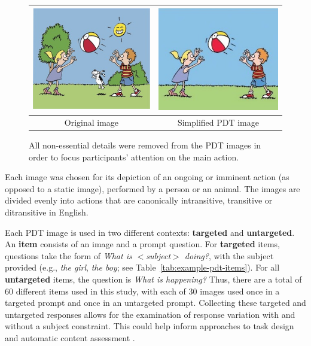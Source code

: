 \begin{figure}[htb!]
\begin{center}
\begin{tabular}{|c|c|}
\hline
{\includegraphics[width=0.38\columnwidth]{figures/throw-original.jpg}} & {\includegraphics[width=0.38\columnwidth]{figures/I21cropped.jpg}} \\
\hline
Original image & Simplified PDT image \\
\hline
\end{tabular}
\caption{\label{fig:image-prep} All non-essential details were removed from the PDT images in order to focus participants' attention on the main action.}
\end{center}
\end{figure}

Each image was chosen for its depiction of an ongoing or imminent action (as opposed to a static image), performed by a person or an animal. The images are divided evenly into actions that are canonically intransitive, transitive or ditransitive in English.

Each PDT image is used in two different contexts: \textbf{targeted} and \textbf{untargeted}. An \textbf{item} consists of an image and a prompt question. For \textbf{targeted} items, questions take the form of \textit{What is $<$subject$>$ doing?}, with the subject provided (e.g., \textit{the girl}, \textit{the boy}; see Table~\ref{tab:example-pdt-items}). For all \textbf{untargeted} items, the question is \textit{What is happening?} Thus, there are a total of 60 different items used in this study, with each of 30 images used once in a targeted prompt and once in an untargeted prompt. Collecting these targeted and untargeted responses allows for the examination of response variation with and without a subject constraint. This could help inform approaches to task design and automatic content assessment \citep{foster2009native, cho2013investigating}. 

